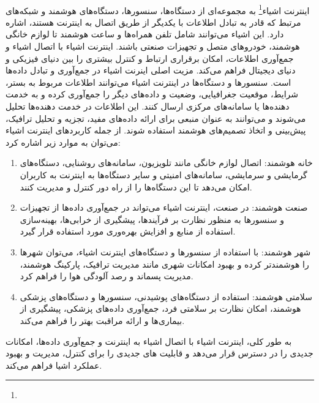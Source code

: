 \paragraph{}
{   
    اینترنت اشیاء\footnote{} به مجموعه‌ای از دستگاه‌ها، سنسورها، دستگاه‌های هوشمند و شبکه‌های مرتبط که قادر
    به تبادل اطلاعات با یکدیگر از طریق اتصال به اینترنت هستند، اشاره دارد. این اشیاء می‌توانند شامل تلفن همراه‌ها و ساعت هوشمند تا لوازم
    خانگی هوشمند، خودروهای متصل و تجهیزات صنعتی باشند. اینترنت اشیاء با اتصال اشیاء و جمع‌آوری اطلاعات، امکان برقراری ارتباط و کنترل 
    بیشتری را بین دنیای فیزیکی و دنیای دیجیتال فراهم می‌کند. مزیت اصلی اینرنت اشیاء در جمع‌آوری و تبادل داده‌ها است. سنسورها و دستگاه‌ها 
    در اینترنت اشیاء می‌توانند اطلاعات مربوط به بستر، شرایط، موقعیت جغرافیایی، وضعیت و داده‌های دیگر را جمع‌آوری کرده و به خدمت دهنده‌ها یا سامانه‌های 
    مرکزی ارسال کنند. این اطلاعات در خدمت دهنده‌ها تحلیل می‌شوند و می‌توانند به عنوان منبعی برای ارائه داده‌های مفید، تجزیه و تحلیل ترافیک، پیش‌بینی و 
    اتخاذ تصمیم‌های هوشمند استفاده شوند. از جمله کاربردهای اینترنت اشیاء می‌توان به موارد زیر اشاره کرد:
    \begin{enumerate}
        \item خانه هوشمند: اتصال لوازم خانگی مانند تلویزیون، سامانه‌های روشنایی، دستگاه‌های گرمایشی و سرمایشی، سامانه‌های امنیتی و سایر دستگاه‌ها به اینترنت به کاربران امکان می‌دهد تا این دستگاه‌ها را از راه دور کنترل و مدیریت کنند.
        \item صنعت هوشمند: در صنعت، اینترنت اشیاء می‌تواند در جمع‌آوری داده‌ها از تجهیزات و سنسورها به منظور نظارت بر فرآیندها، پیشگیری از خرابی‌ها، بهینه‌سازی استفاده از منابع و افزایش بهره‌وری مورد استفاده قرار گیرد.
        \item شهر هوشمند: با استفاده از سنسورها و دستگاه‌های اینترنت اشیاء، می‌توان شهرها را هوشمندتر کرده و بهبود امکانات شهری مانند مدیریت ترافیک، پارکینگ هوشمند، مدیریت پسماند و رصد آلودگی هوا را فراهم کرد.
        \item سلامتی هوشمند: استفاده از دستگاه‌های پوشیدنی، سنسورها و دستگاه‌های پزشکی هوشمند، امکان نظارت بر سلامتی فرد، جمع‌آوری داده‌های پزشکی، پیشگیری از بیماری‌ها و ارائه مراقبت بهتر را فراهم می‌کند.
    \end{enumerate}
    به طور کلی، اینترنت اشیاء با اتصال اشیاء به اینترنت و جمع‌آوری داده‌ها، امکانات جدیدی را در دسترس قرار می‌دهد و قابلیت های جدیدی را برای کنترل، مدیریت و بهبود عملکرد اشیا فراهم می‌کند.
    \begin{figure}[H]

\end{figure}}
